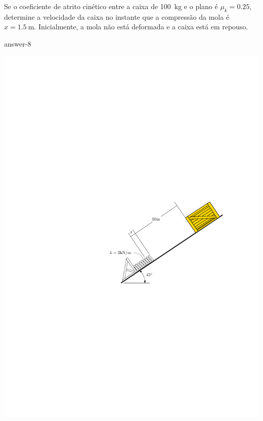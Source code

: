 
\item Se o coeficiente de atrito cinético entre a caixa de \SI{100}{\kilogram} e o plano 
é $\mu_{k}=0.25$, determine a velocidade da caixa no instante que a compressão da mola é $x=\SI{1.5}{\meter}$. Inicialmente, a mola não está deformada e a caixa está em repouso.

{answer-8}

\vspace{-1.5cm}
\begin{flushright}
    \includegraphics[scale=1.3]{images/draw_8.pdf}
\end{flushright}